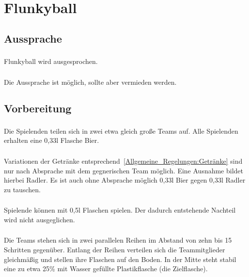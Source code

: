 \section{Flunkyball}
\subsection{Aussprache}
\subsubsection{}
Flunkyball wird  ausgesprochen.

\subsubsection{}
Die Aussprache  ist möglich, sollte aber vermieden werden.

\subsection{Vorbereitung}
\subsubsection{}
Die Spielenden teilen sich in zwei etwa gleich große Teams auf.
Alle Spielenden erhalten eine 0,33l Flasche Bier.

\subsubsection{}Variationen der Getränke entsprechend~\ref{Allgemeine_Regelungen:Getränke} sind nur nach Absprache mit dem gegnerischen Team möglich.
Eine Ausnahme bildet hierbei Radler.
Es ist auch ohne Absprache möglich 0,33l Bier gegen 0,33l Radler zu tauschen.

\subsubsection{}
Spielende können mit 0,5l Flaschen spielen. Der dadurch entstehende Nachteil wird nicht ausgeglichen.

\subsubsection{}
Die Teams stehen sich in zwei parallelen Reihen im Abstand von zehn bis 15 Schritten gegenüber.
Entlang der Reihen verteilen sich die Teammitglieder gleichmäßig und stellen ihre Flaschen auf den Boden.
In der Mitte steht stabil eine zu etwa 25\% mit Wasser gefüllte Plastikflasche (die Zielflasche).

